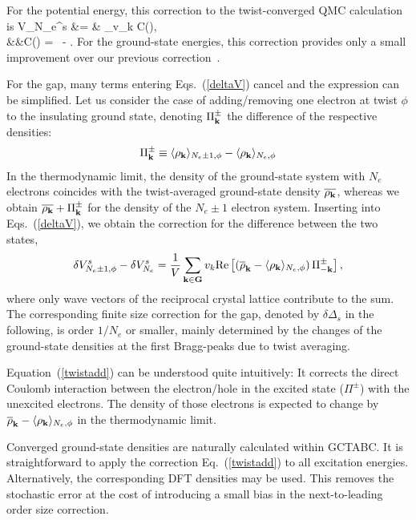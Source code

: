 For the potential energy, this correction to the twist-converged QMC calculation is
\bea
\delta V_{N_e}^s &= &
  \sum_\kvec v_k \delta C(\kvec), \nonumber \\
&&\delta C(\kvec) =
\overline{\rho_\kvec } \, \overline{\rho_{-\kvec}}
- \overline{\rho_\kvec \rho_{-\kvec}} .
\label{deltaV}
\eea
For the ground-state energies, this correction provides only a small improvement over our previous correction~\cite{fse,finitesize}.

For the gap, many terms entering Eqs.~(\ref{deltaV}) cancel and the expression can be simplified. Let us consider the case of adding/removing one electron at twist $\phi$ to
the insulating ground state, denoting $\Pi_{\bf k}^{\pm}$ the difference of the respective densities:
\begin{equation}
\Pi_{\bf k}^{\pm} \equiv
\langle \rho_{\bf k}  \rangle_{N_e \pm 1,\phi} - \langle \rho_{\bf k}  \rangle_{N_e,\phi}
\end{equation}
In the thermodynamic limit, the density of the ground-state system with $N_e$ electrons
coincides with the twist-averaged ground-state density $\overline{\rho_{\bf k}}$, whereas
we obtain $\overline{\rho_{\bf k}}+\Pi_{\bf k}^{\pm}$
for the density of the $N_e \pm 1$ electron system.
Inserting into Eqs.~(\ref{deltaV}), we obtain the correction for the difference between the two states,
\begin{equation}
\delta V_{N_e \pm 1,\phi}^s - \delta V_{N_e}^s
= \frac{1}{V} \sum_{{\bf k}\in {\bf G}} v_k \text{Re}
\left[ \left( \overline{\rho}_{\bf k}
- \langle \rho_{\bf k} \rangle_{N_e,\phi} \right) \Pi_{-{\bf k}}^{\pm}
\right],
\label{twistadd}
\end{equation}
where only wave vectors of the reciprocal crystal lattice contribute
to the sum.
The corresponding finite size correction for the gap,
denoted by $\delta \Delta_s$ in the following,
is order $1/N_e$ or smaller, mainly determined by the changes
of the ground-state densities at the first Bragg-peaks due to twist averaging.

Equation~(\ref{twistadd}) can be understood quite intuitively: It corrects the
direct Coulomb interaction between the electron/hole in the
excited state ($\Pi^\pm$) with the unexcited electrons. The density
of those electrons is expected to change
by $\overline{\rho}_{\bf k} - \langle \rho_{\bf k} \rangle_{N_e,\phi}$
in the thermodynamic limit.

Converged ground-state densities are naturally calculated within
GCTABC.  It is straightforward to apply the correction Eq.~(\ref{twistadd})
to all excitation energies.
Alternatively, the corresponding
 DFT densities may be used. This removes the stochastic error at the cost of
introducing a small bias in the next-to-leading order size correction.

